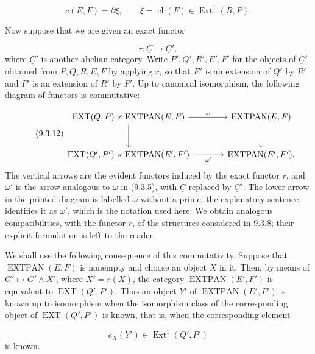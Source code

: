 \begin{equation}\tag{9.3.10}
c(E,F)=\partial\xi,
\qquad
\xi=\operatorname{cl}(F)\in\operatorname{Ext}^1(R,P).
\end{equation}

Now suppose that we are given an exact functor

\begin{equation}\tag{9.3.11}
r:\underline C\longrightarrow\underline C',
\end{equation}
where $\underline C'$ is another abelian category. Write
$P',Q',R',E',F'$ for the objects of $\underline C'$ obtained from
$P,Q,R,E,F$ by applying $r$, so that $E'$ is an extension of $Q'$ by
$R'$ and $F'$ is an extension of $R'$ by $P'$. Up to canonical
isomorphism, the following diagram of functors is commutative:

\begin{equation}\tag{9.3.12}
\begin{tikzcd}[column sep=large,row sep=large]
\operatorname{EXT}(Q,P)\times\operatorname{EXTPAN}(E,F)
  \arrow[r,"\omega"]\arrow[d]
& \operatorname{EXTPAN}(E,F)\arrow[d]\\
\operatorname{EXT}(Q',P')\times\operatorname{EXTPAN}(E',F')
  \arrow[r,"\omega'"']
& \operatorname{EXTPAN}(E',F').
\end{tikzcd}
\end{equation}
The vertical arrows are the evident functors induced by the exact functor
$r$, and $\omega'$ is the arrow analogous to $\omega$ in (9.3.5), with
$\underline C$ replaced by $\underline C'$. The lower arrow in the
printed diagram is labelled $\omega$ without a prime; the explanatory
sentence identifies it as $\omega'$, which is the notation used here.
We obtain analogous compatibilities, with the functor $r$, of the
structures considered in 9.3.8; their explicit formulation is left to the
reader.

We shall use the following consequence of this commutativity. Suppose that
$\operatorname{EXTPAN}(E,F)$ is nonempty and choose an object $X$ in it.
Then, by means of $G'\longmapsto G'\wedge X'$, where $X'=r(X)$, the
category $\operatorname{EXTPAN}(E',F')$ is equivalent to
$\operatorname{EXT}(Q',P')$. Thus an object $Y'$ of
$\operatorname{EXTPAN}(E',F')$ is known up to isomorphism when the
isomorphism class of the corresponding object of
$\operatorname{EXT}(Q',P')$ is known, that is, when the corresponding
element

\begin{equation*}
c_X(Y')\in\operatorname{Ext}^1(Q',P')
\end{equation*}
is known.

